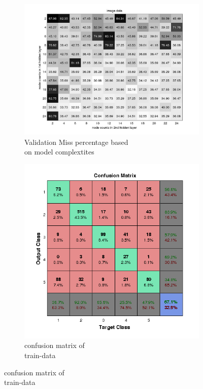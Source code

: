 \documentclass[fleqn]{article}
\begin{document}
\begin{figure}[!ht]
\begin{subfigure}{.5\textwidth}
  \caption{Validation Miss percentage based\\ on model complextites}
\includegraphics[scale=0.2]{pics/imagedata/image data_validationerror}
\end{subfigure}
\begin{subfigure}{.5\textwidth}
\caption{confusion matrix of\\ train-data}
\includegraphics[scale=0.5]{./pics/imagedata/_16_10/_16_10_epoch_Inf_confusiontrain}
\end{subfigure}
\end{figure}
\end{document}
